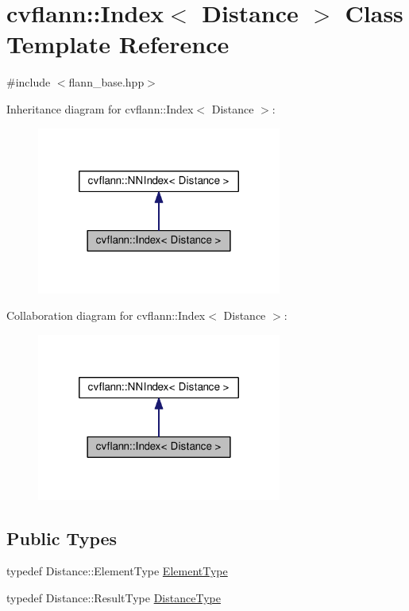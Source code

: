 \hypertarget{classcvflann_1_1Index}{\section{cvflann\-:\-:Index$<$ Distance $>$ Class Template Reference}
\label{classcvflann_1_1Index}
}


{\ttfamily \#include $<$flann\-\_\-base.\-hpp$>$}



Inheritance diagram for cvflann\-:\-:Index$<$ Distance $>$\-:\nopagebreak
\begin{figure}[H]
\begin{center}
\leavevmode
\includegraphics[width=228pt]{classcvflann_1_1Index__inherit__graph}
\end{center}
\end{figure}


Collaboration diagram for cvflann\-:\-:Index$<$ Distance $>$\-:\nopagebreak
\begin{figure}[H]
\begin{center}
\leavevmode
\includegraphics[width=228pt]{classcvflann_1_1Index__coll__graph}
\end{center}
\end{figure}
\subsection*{Public Types}
\begin{DoxyCompactItemize}
\item 
typedef Distance\-::\-Element\-Type \hyperlink{classcvflann_1_1Index_a9fbfc2c13b3226997cfc15fc3a55b7c5}{Element\-Type}
\item 
typedef Distance\-::\-Result\-Type \hyperlink{classcvflann_1_1Index_adce66132d9ad41de0181fddd214b5e51}{Distance\-Type}
\end{DoxyCompactItemize}
